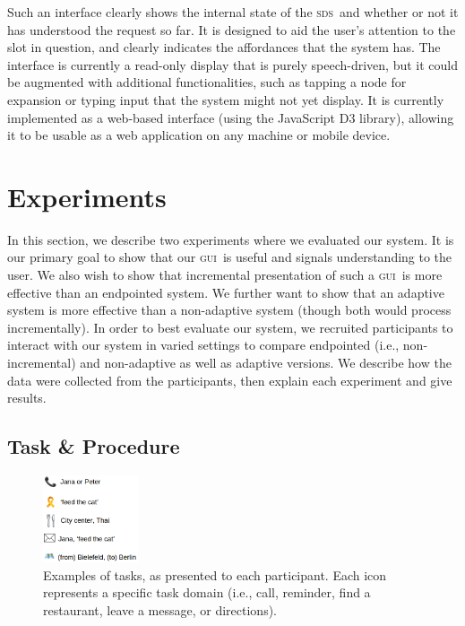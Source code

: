 \documentclass[11pt]{article}
\newcommand{\sds}[0]{\textsc{sds}}
\newcommand{\ui}[0]{\textsc{gui}}
\begin{document}
Such an interface clearly shows the internal state of the \sds\ and whether or not it has understood the request so far. It is designed to aid the user's attention to the slot in question, and clearly indicates the affordances that the system has. The interface is currently a read-only display that is purely speech-driven, but it could be augmented with additional functionalities, such as tapping a node for expansion or typing input that the system might not yet display. It is currently implemented as a web-based interface (using the JavaScript D3 library), allowing it to be usable as a web application on any machine or mobile device. 


\section{Experiments}
\label{section:experiments}

In this section, we describe two experiments where we evaluated our system. It is our primary goal to show that our \ui\ is useful and signals understanding to the user. We also wish to show that incremental presentation of such a \ui\ is more effective than an endpointed system. We further want to show that an adaptive system is more effective than a non-adaptive system (though both would process incrementally). In order to best evaluate our system, we recruited participants to interact with our system in varied settings to compare endpointed (i.e., non-incremental) and non-adaptive as well as adaptive versions. We describe how the data were collected from the participants, then explain each experiment and give results.

\subsection{Task \& Procedure} 

\begin{figure}
  \centering
      \includegraphics[width=0.25\textwidth]{figures/taskexample.png}	
      \caption{Examples of tasks, as presented to each participant. Each icon represents a specific task domain (i.e., call, reminder, find a restaurant, leave a message, or directions).\label{fig:taskex}}
\end{figure}
\end{document}
